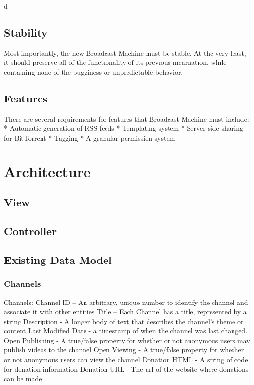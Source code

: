 d\documentclass[a4paper,12pt]{report}
\begin{document}
{{\section{Stability}

	Most importantly, the new Broadcast Machine must be stable. 
At the very least, it should preserve all of the functionality of its previous incarnation, while containing none of the bugginess or unpredictable behavior. 

\section{Features}
	There are several requirements for features that Broadcast Machine must include:
 * Automatic generation of RSS feeds
 * Templating system
 * Server-side sharing for BitTorrent
 * Tagging
 * A granular permission system

\chapter{Architecture}

\section{View}

\section{Controller}

\section{Existing Data Model}

\subsection{Channels}
Channels:
	Channel ID – An arbitrary, unique number to identify the channel and  associate it with other entities
	Title – Each Channel has a title, represented by a string
	Description - A longer body of text that describes the channel's theme or content
	Last Modified Date - a timestamp of when the channel was last changed.
	Open Publishing - A true/false property for whether or not anonymous users may publish videos to the channel
	Open Viewing - A true/false property for whether or not anonymous users can view the channel
	Donation HTML - A string of code for donation information
	Donation URL - The url of the website where donations can be made 

}}
\end{document}
